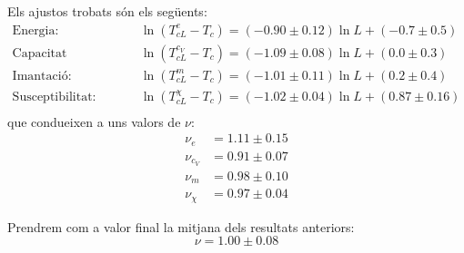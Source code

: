 \documentclass[a4paper]{article}
\begin{document}
Els ajustos trobats són els següents:
\begin{align*}
    \text{Energia:} &\quad \ln \left(T_{cL}^{e} - T_c\right) = (-0.90 \pm 0.12) \ln L + (-0.7 \pm 0.5) \\
    \text{Capacitat calorífica:} &\quad \ln \left(T_{cL}^{c_V} - T_c\right) = (-1.09 \pm 0.08) \ln L + (0.0 \pm 0.3) \\
    \text{Imantació:} &\quad \ln \left(T_{cL}^{m} - T_c\right) = (-1.01 \pm 0.11) \ln L + (0.2 \pm 0.4) \\
    \text{Susceptibilitat:} &\quad \ln \left(T_{cL}^{\chi} - T_c\right) = (-1.02 \pm 0.04) \ln L + (0.87 \pm 0.16) \\
\end{align*}
que condueixen a uns valors de $\nu$:
\begin{align*}
	\nu_e &= 1.11 \pm 0.15 \\
	\nu_{c_V} &= 0.91 \pm 0.07 \\
	\nu_m &= 0.98 \pm 0.10 \\
	\nu_\chi &= 0.97 \pm 0.04
\end{align*}

Prendrem com a valor final la mitjana dels resultats anteriors:
\begin{equation} \label{nu}
    \nu = 1.00 \pm 0.08
\end{equation}
\end{document}
